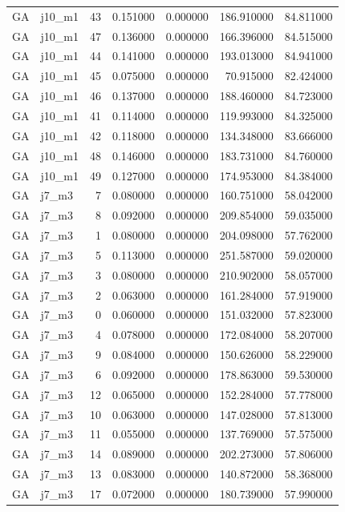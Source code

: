 \begin{tabular}{llrrrrr}
GA & j10_m1 & 43 & 0.151000 & 0.000000 & 186.910000 & 84.811000 \\
GA & j10_m1 & 47 & 0.136000 & 0.000000 & 166.396000 & 84.515000 \\
GA & j10_m1 & 44 & 0.141000 & 0.000000 & 193.013000 & 84.941000 \\
GA & j10_m1 & 45 & 0.075000 & 0.000000 & 70.915000 & 82.424000 \\
GA & j10_m1 & 46 & 0.137000 & 0.000000 & 188.460000 & 84.723000 \\
GA & j10_m1 & 41 & 0.114000 & 0.000000 & 119.993000 & 84.325000 \\
GA & j10_m1 & 42 & 0.118000 & 0.000000 & 134.348000 & 83.666000 \\
GA & j10_m1 & 48 & 0.146000 & 0.000000 & 183.731000 & 84.760000 \\
GA & j10_m1 & 49 & 0.127000 & 0.000000 & 174.953000 & 84.384000 \\
GA & j7_m3 & 7 & 0.080000 & 0.000000 & 160.751000 & 58.042000 \\
GA & j7_m3 & 8 & 0.092000 & 0.000000 & 209.854000 & 59.035000 \\
GA & j7_m3 & 1 & 0.080000 & 0.000000 & 204.098000 & 57.762000 \\
GA & j7_m3 & 5 & 0.113000 & 0.000000 & 251.587000 & 59.020000 \\
GA & j7_m3 & 3 & 0.080000 & 0.000000 & 210.902000 & 58.057000 \\
GA & j7_m3 & 2 & 0.063000 & 0.000000 & 161.284000 & 57.919000 \\
GA & j7_m3 & 0 & 0.060000 & 0.000000 & 151.032000 & 57.823000 \\
GA & j7_m3 & 4 & 0.078000 & 0.000000 & 172.084000 & 58.207000 \\
GA & j7_m3 & 9 & 0.084000 & 0.000000 & 150.626000 & 58.229000 \\
GA & j7_m3 & 6 & 0.092000 & 0.000000 & 178.863000 & 59.530000 \\
GA & j7_m3 & 12 & 0.065000 & 0.000000 & 152.284000 & 57.778000 \\
GA & j7_m3 & 10 & 0.063000 & 0.000000 & 147.028000 & 57.813000 \\
GA & j7_m3 & 11 & 0.055000 & 0.000000 & 137.769000 & 57.575000 \\
GA & j7_m3 & 14 & 0.089000 & 0.000000 & 202.273000 & 57.806000 \\
GA & j7_m3 & 13 & 0.083000 & 0.000000 & 140.872000 & 58.368000 \\
GA & j7_m3 & 17 & 0.072000 & 0.000000 & 180.739000 & 57.990000 \\

\end{tabular}
